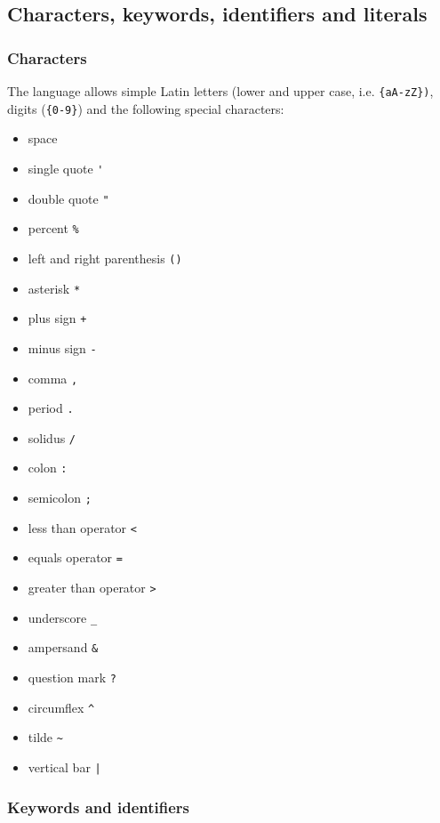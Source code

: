 \documentclass[11pt,a4paper]{ivoa}
\begin{document}
\subsection{Characters, keywords, identifiers and literals}
\subsubsection{Characters}
\label{sec:characters}

The language allows simple Latin letters (lower and upper case, i.e.
\verb:{aA-zZ}):, digits (\verb:{0-9}:) and the following special characters:

\begin{itemize}
    \item space
    \item single quote \verb:':
    \item double quote \verb:":
    \item percent \verb:%:
    \item left and right parenthesis \verb:():
    \item asterisk \verb:*:
    \item plus sign \verb:+:
    \item minus sign \verb:-:
    \item comma \verb:,:
    \item period \verb:.:
    \item solidus \verb:/:
    \item colon \verb.:.
    \item semicolon \verb:;:
    \item less than operator \verb:<:
    \item equals operator \verb:=:
    \item greater than operator \verb:>:
    \item underscore \verb:_:
    \item ampersand \verb:&:
    \item question mark \verb:?:
    \item circumflex \verb:^:
    \item tilde \verb:~:
    \item vertical bar \verb:|:
\end{itemize}

\subsubsection{Keywords and identifiers}
\label{sec:keywords}
\end{document}
